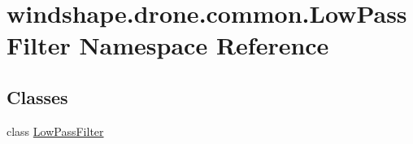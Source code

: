 \hypertarget{namespacewindshape_1_1drone_1_1common_1_1_low_pass_filter}{}\section{windshape.\+drone.\+common.\+Low\+Pass\+Filter Namespace Reference}
\label{namespacewindshape_1_1drone_1_1common_1_1_low_pass_filter}
\subsection*{Classes}
\begin{DoxyCompactItemize}
\item 
class \mbox{\hyperlink{classwindshape_1_1drone_1_1common_1_1_low_pass_filter_1_1_low_pass_filter}{Low\+Pass\+Filter}}
\end{DoxyCompactItemize}
